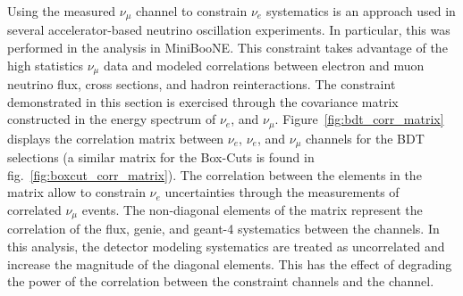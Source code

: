 Using the measured $\nu_{\mu}$ channel to constrain $\nu_e$ systematics is an approach used in several accelerator-based neutrino oscillation experiments. In particular, this was performed in the \nue analysis in MiniBooNE. This constraint takes advantage of the high statistics $\nu_{\mu}$ data and modeled correlations between electron and muon neutrino flux, cross sections, and hadron reinteractions. %
The constraint demonstrated in this section is exercised through the covariance matrix constructed in the energy spectrum of $\nu_e$, and $\nu_{\mu}$. 
Figure~\ref{fig:bdt_corr_matrix} displays the correlation matrix between \npsel $\nu_e$, \zpsel $\nu_e$, and $\nu_{\mu}$ channels for the BDT \nue selections (a similar matrix for the Box-Cuts is found in fig.~\ref{fig:boxcut_corr_matrix}). The correlation between the elements in the matrix allow to constrain $\nu_e$ uncertainties through the measurements of correlated $\nu_{\mu}$ events. 
The non-diagonal elements of the matrix represent the correlation of the flux, genie, and geant-4 systematics between the  channels. In this analysis, the detector modeling systematics are treated as uncorrelated and increase the magnitude of the diagonal elements. This has the effect of degrading the power of the correlation between the constraint channels and the \npsel channel.

{}

